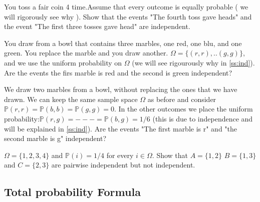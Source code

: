 \documentclass[12pt]{article}
\newcommand{\<}{{\langle \!\! \langle}}
\renewcommand{\>}{{\rangle \!\! \rangle}}
\begin{document}
\begin{ExerciseList}


	\Exercise You toss a fair coin 4 time.Assume that every outcome is equally probable ( we will rigorously see why ). Show that the events "The fourth toss gave heads" and the event "The first three tosses gave head" are independent.  

	\Exercise You draw from a  bowl that contains three marbles, one red, one blu, and one green. You replace the marble and you draw another. $\Omega=\{(r,r),..(g,g)\}$, and we use the uniform probability on $\Omega$ (we will see rigourously why in \ref{ss:ind}). Are the events the firs marble is red and the second is green independent?
	
	\Exercise We draw two marbles from a bowl, without replacing the ones that we have drawn. We can keep the same sample space $\Omega$  as before and consider $\mathbb{P}(r,r)=\mathbb{P}(b,b)=\mathbb{P}(g,g)=0$. In the other outcomes we place the uniform probability:$\mathbb{P}(r,g)=---=\mathbb{P}(b,g)=1/6 $ (this is due to independence and will be explained in \ref{ss:ind}). Are the events "The first marble is r" and "the second marble is g" independent? 

	\Exercise $\Omega = \{1,2,3,4\}$ and $\mathbb{P}(i) = 1/4 $ for every $i\in \Omega$. Show that $A=\{1,2\}$ $B=\{1,3\}$ and $C=\{2,3\}$ are pairwise independent but not independent. 

\end{ExerciseList}
 



\subsection{Total probability Formula}
\end{document}
